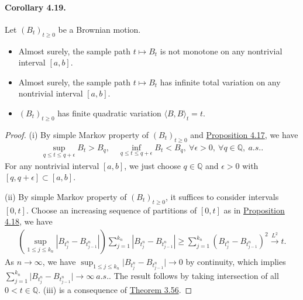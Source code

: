 \documentclass{article}
\numberwithin{equation}{section}
\theoremstyle{plain}
\theoremstyle{definition}
\begin{document}
\paragraph{Corollary 4.19.\label{cor:4.19}} Let $(B_t)_{t\geq 0}$ be a Brownian motion.
\begin{itemize}
\item[(i)] Almost surely, the sample path $t\mapsto B_t$ is not monotone on any nontrivial interval $[a,b]$.
\item[(ii)] Almost surely, the sample path $t\mapsto B_t$ has infinite total variation on any nontrivial interval $[a,b]$.
\item[(iii)] $(B_t)_{t\geq 0}$ has finite quadratic variation $\langle B,B\rangle_t=t$.
\end{itemize}
\begin{proof}
(i) By simple Markov property of $(B_t)_{t\geq 0}$ and \hyperref[prop:4.17]{Proposition 4.17}, we have
\begin{align*}
	\sup_{q\leq t\leq q+\epsilon} B_t>B_q,\quad \inf_{q\leq t\leq q+\epsilon} B_t<B_q,\ \forall \epsilon>0,\ \forall q\in\mathbb{Q},\ a.s..
\end{align*}
For any nontrivial interval $[a,b]$, we just choose $q\in\mathbb{Q}$ and $\epsilon>0$ with $[q,q+\epsilon]\subset[a,b]$.\vspace{0.1cm}

(ii) By simple Markov property of $(B_t)_{t\geq 0}$, it suffices to consider intervals $[0,t]$. Choose an increasing sequence of partitions of $[0,t]$ as in \hyperref[prop:4.18]{Proposition 4.18}, we have
\begin{align*}
	\left(\sup_{1\leq j\leq k_n}\left\vert B_{t_j^n}-B_{t_{j-1}^n}\right\vert\right)\sum_{j=1}^{k_n}\left\vert B_{t_j^n}-B_{t_{j-1}^n}\right\vert\geq \sum_{j=1}^{k_n}\left(B_{t_j^n}-B_{t_{j-1}^n}\right)^2\overset{L^2}{\to}t.
\end{align*}
As $n\to\infty$, we have $\sup_{1\leq j\leq k_n}\vert B_{t_j^n}-B_{t_{j-1}^n}\vert\to 0$ by continuity, which implies $\sum_{j=1}^{k_n}\vert B_{t_j^n}-B_{t_{j-1}^n}\vert\to\infty\ a.s.$. The result follows by taking intersection of all $0<t\in\mathbb{Q}$. (iii) is a consequence of \hyperref[thm:3.56]{Theorem 3.56}.
\end{proof}
\end{document}
